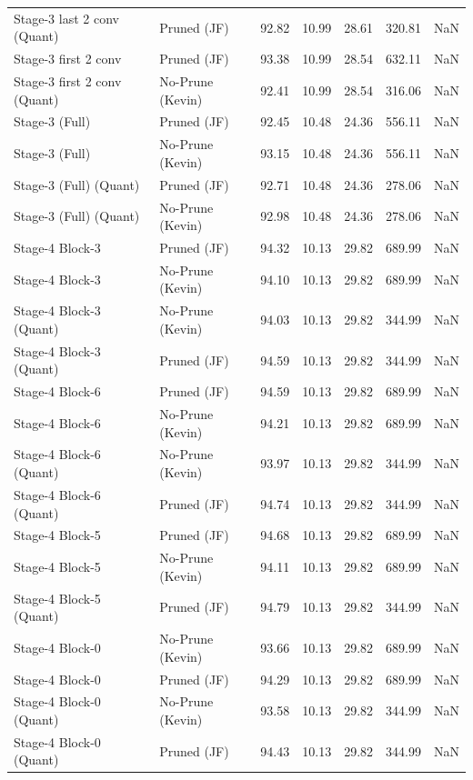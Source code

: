 \begin{table}
\begin{tabular}{llrrrrl}
Stage-3 last 2 conv
(Quant) & Pruned (JF) & 92.82 & 10.99 & 28.61 & 320.81 & NaN \\
Stage-3 first 2 conv & Pruned (JF) & 93.38 & 10.99 & 28.54 & 632.11 & NaN \\
Stage-3 first 2 conv
(Quant) & No-Prune (Kevin) & 92.41 & 10.99 & 28.54 & 316.06 & NaN \\
Stage-3 (Full) & Pruned (JF) & 92.45 & 10.48 & 24.36 & 556.11 & NaN \\
Stage-3 (Full) & No-Prune (Kevin) & 93.15 & 10.48 & 24.36 & 556.11 & NaN \\
Stage-3 (Full)
(Quant) & Pruned (JF) & 92.71 & 10.48 & 24.36 & 278.06 & NaN \\
Stage-3 (Full)
(Quant) & No-Prune (Kevin) & 92.98 & 10.48 & 24.36 & 278.06 & NaN \\
Stage-4 Block-3 & Pruned (JF) & 94.32 & 10.13 & 29.82 & 689.99 & NaN \\
Stage-4 Block-3 & No-Prune (Kevin) & 94.10 & 10.13 & 29.82 & 689.99 & NaN \\
Stage-4 Block-3
(Quant) & No-Prune (Kevin) & 94.03 & 10.13 & 29.82 & 344.99 & NaN \\
Stage-4 Block-3
(Quant) & Pruned (JF) & 94.59 & 10.13 & 29.82 & 344.99 & NaN \\
Stage-4 Block-6 & Pruned (JF) & 94.59 & 10.13 & 29.82 & 689.99 & NaN \\
Stage-4 Block-6 & No-Prune (Kevin) & 94.21 & 10.13 & 29.82 & 689.99 & NaN \\
Stage-4 Block-6
(Quant) & No-Prune (Kevin) & 93.97 & 10.13 & 29.82 & 344.99 & NaN \\
Stage-4 Block-6
(Quant) & Pruned (JF) & 94.74 & 10.13 & 29.82 & 344.99 & NaN \\
Stage-4 Block-5 & Pruned (JF) & 94.68 & 10.13 & 29.82 & 689.99 & NaN \\
Stage-4 Block-5 & No-Prune (Kevin) & 94.11 & 10.13 & 29.82 & 689.99 & NaN \\
Stage-4 Block-5
(Quant) & Pruned (JF) & 94.79 & 10.13 & 29.82 & 344.99 & NaN \\
Stage-4 Block-0 & No-Prune (Kevin) & 93.66 & 10.13 & 29.82 & 689.99 & NaN \\
Stage-4 Block-0 & Pruned (JF) & 94.29 & 10.13 & 29.82 & 689.99 & NaN \\
Stage-4 Block-0
(Quant) & No-Prune (Kevin) & 93.58 & 10.13 & 29.82 & 344.99 & NaN \\
Stage-4 Block-0
(Quant) & Pruned (JF) & 94.43 & 10.13 & 29.82 & 344.99 & NaN \\

\end{tabular}
\end{table}
